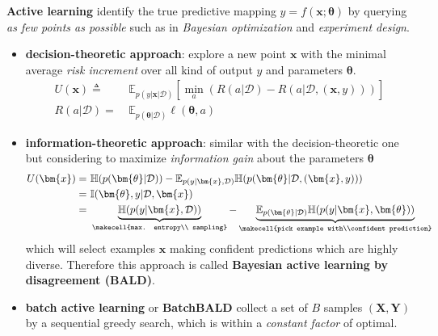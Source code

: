 \textbf{Active learning} identify the true predictive mapping $y=f(\bm{x};\bm{\theta})$ by querying \textit{as few points as possible} such as in \textit{Bayesian optimization} and \textit{experiment design}.
\begin{itemize}
    \item \textbf{decision-theoretic approach}: explore a new point $\bm{x}$ with the minimal average \textit{risk increment} over all kind of output $y$ and parameters $\bm{\theta}$.
    \begin{align}
        U(\bm{x})\triangleq&~\mathbb{E}_{p(y|\bm{x}|\mathcal{D})}\left[
            \min_{a}(R(a|\mathcal{D})-R(a|\mathcal{D},(\bm{x},y)))
        \right]\\
        R(a|\mathcal{D}) =&~\mathbb{E}_{p(\bm{\theta}|\mathcal{D})}\ell(\bm{\theta},a)
    \end{align}

    \item \textbf{information-theoretic approach}: similar with the decision-theoretic one but considering to maximize \textit{information gain} about the parameters $\bm{\theta}$
    \begin{align}
        U(\bm{x}) =&~ \mathbb{H}(p(\bm{\theta}|\mathcal{D})) - \mathbb{E}_{p(y|\bm{x},\mathcal{D})}\mathbb{H}(p(\bm{\theta}|\mathcal{D},(\bm{x},y))) \\
        =&~ \mathbb{I}(\bm{\theta},y|\mathcal{D},\bm{x}) \\
        =&~ \underbrace{\mathbb{H}(p(y|\bm{x},\mathcal{D}))}_\text{\makecell{max. entropy\\ sampling}} - \underbrace{\mathbb{E}_{p(\bm{\theta}|\mathcal{D})}\mathbb{H}(p(y|\bm{x},\bm{\theta}))}_\text{\makecell{pick example with\\confident prediction}} \label{eq:actlearninfo}
    \end{align}
    which will select examples $\bm{x}$ making confident predictions which are highly diverse. 
    Therefore this approach is called \textbf{Bayesian active learning by disagreement (BALD)}.

    \item \textbf{batch active learning} or \textbf{BatchBALD} collect a set of $B$ samples $(\mathbf{X}, \mathbf{Y})$ by a sequential greedy search, which is within a \textit{constant factor} of optimal.
\end{itemize}

 

